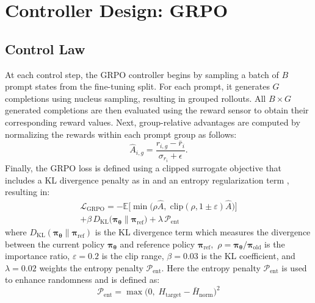 \documentclass[letterpaper, 10 pt, conference]{ieeeconf}
\begin{document}
\section{Controller Design: GRPO}



\subsection{Control Law}

At each control step, the GRPO controller begins by sampling a batch of $B$ prompt states from the fine-tuning split. For each prompt, it generates $G$ completions using nucleus sampling, resulting in grouped rollouts. All $B\times G$ generated completions are then evaluated using the reward sensor to obtain their corresponding reward values. Next, group-relative advantages are computed by normalizing the rewards within each prompt group as follows:
    \begin{equation}
        \hat{A}_{i,g} = \frac{r_{i,g} - \bar{r}_i}{\sigma_{r_i} + \epsilon}.
    \end{equation}
    Finally, the GRPO loss is defined using a clipped surrogate objective that includes a KL divergence penalty as in \cite{Jaques2016} and an entropy regularization term \cite{Jaques2016,haarnoja2018}, resulting in:
    \begin{equation}
    \label{eq_L_GRPO}
    \begin{split}
        \mathcal{L}_{\mathrm{GRPO}} = -\mathbb{E}\bigl[\min\bigl(\rho \hat{A},\; \mathrm{clip}(\rho, 1{\pm}\varepsilon)\hat{A}\bigr)\bigr] \\
        + \beta \, D_{\mathrm{KL}}\!\bigl(\bm{\pi}_{\bm{\theta}} \| \bm{\pi}_{\mathrm{ref}}\bigr) + \lambda \, \mathcal{P}_{\mathrm{ent}}
    \end{split}
    \end{equation}
where $D_{\mathrm{KL}}(\bm{\pi}_{\bm{\theta}} \| \bm{\pi}_{\mathrm{ref}})$ is the KL divergence term which measures the divergence between the current policy $\bm{\pi}_{\bm{\theta}}$ and reference policy $\bm{\pi}_{\mathrm{ref}},$
$\rho = \bm{\pi}_{\bm{\theta}} / \bm{\pi}_{\mathrm{old}}$ is the importance ratio, $\varepsilon = 0.2$ is the clip range, $\beta = 0.03$ is the KL coefficient, and $\lambda = 0.02$ weights the entropy penalty $\mathcal{P}_{\mathrm{ent}}.$  
Here the entropy penalty $\mathcal{P}_{\mathrm{ent}}$ is used to enhance randomness and is defined as:
\begin{equation}
    \mathcal{P}_{\mathrm{ent}} = \max\bigl(0,\; H_{\mathrm{target}} - \bar{H}_{\mathrm{norm}}\bigr)^2
\end{equation}
\end{document}
